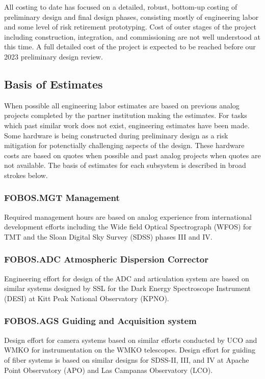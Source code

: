 \documentclass[oneside,11pt]{amsart}
\begin{document}
All costing to date has focused on a detailed, robust, bottom-up
costing of preliminary design and final design phases, consisting
mostly of engineering labor and some level of risk retirement
prototyping. Cost of outer stages of the project including
construction, integration, and commissioning are not well understood
at this time. A full detailed cost of the project is expected to be
reached before our 2023 preliminary design review.

\subsection{Basis of Estimates}

When possible all engineering labor estimates are based on previous
analog projects completed by the partner institution making the
estimates. For tasks which past similar work does not exist,
engineering estimates have been made. Some hardware is being
constructed during preliminary design as a risk mitigation for
potenctially challenging aspects of the design. These hardware costs
are based on quotes when possible and past analog projects when
quotes are not available. The basis of estimates for each subsystem
is described in broad strokes below.

\subsubsection{FOBOS.MGT Management}

Required management hours are based on analog experience from
international development efforts including the Wide field Optical
Spectrograph (WFOS) for TMT and the Sloan Digital Sky Survey (SDSS)
phases III and IV.

\subsubsection{FOBOS.ADC Atmospheric Dispersion Corrector}

Engineering effort for design of the ADC and articulation system are
based on similar systems designed by SSL for the Dark Energy
Spectroscope Instrument (DESI) at Kitt Peak National Observatory
(KPNO).

\subsubsection{FOBOS.AGS Guiding and Acquisition system}

Design effort for camera systems based on similar efforts conducted
by UCO and WMKO for instrumentation on the WMKO telescopes. Design
effort for guiding of fiber systems is based on similar designs for
SDSS-II, III, and IV at Apache Point Observatory (APO) and Las
Campanas Observatory (LCO).
\end{document}
